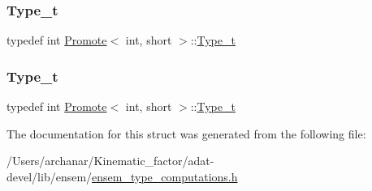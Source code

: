 \subsubsection{\texorpdfstring{Type\_t}{Type\_t}\hspace{0.1cm}{\footnotesize\ttfamily [2/3]}}
{\footnotesize\ttfamily typedef int \mbox{\hyperlink{structPromote}{Promote}}$<$ int, short $>$\+::\mbox{\hyperlink{structPromote_3_01int_00_01short_01_4_aeccdff5aed8403672c3c04fc17570d5e}{Type\+\_\+t}}}

\mbox{\label{structPromote_3_01int_00_01short_01_4_aeccdff5aed8403672c3c04fc17570d5e}} 
\subsubsection{\texorpdfstring{Type\_t}{Type\_t}\hspace{0.1cm}{\footnotesize\ttfamily [3/3]}}
{\footnotesize\ttfamily typedef int \mbox{\hyperlink{structPromote}{Promote}}$<$ int, short $>$\+::\mbox{\hyperlink{structPromote_3_01int_00_01short_01_4_aeccdff5aed8403672c3c04fc17570d5e}{Type\+\_\+t}}}



The documentation for this struct was generated from the following file\+:\begin{DoxyCompactItemize}
\item 
/\+Users/archanar/\+Kinematic\+\_\+factor/adat-\/devel/lib/ensem/\mbox{\hyperlink{adat-devel_2lib_2ensem_2ensem__type__computations_8h}{ensem\+\_\+type\+\_\+computations.\+h}}\end{DoxyCompactItemize}
